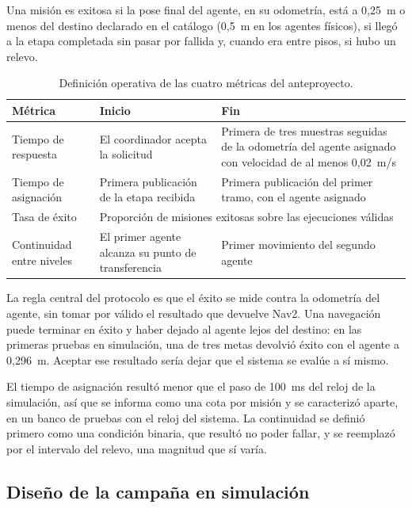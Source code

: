 Una misión es exitosa si la pose final del agente, en su odometría, está a 0,25~m o menos del destino declarado en el catálogo (0,5~m en los agentes físicos), si llegó a la etapa completada sin pasar por fallida y, cuando era entre
pisos, si hubo un relevo.

\begin{table}[H]
  \centering\footnotesize
  \caption{Definición operativa de las cuatro métricas del anteproyecto.}
  \label{tab:metricas}
  \begin{tabular}{@{}p{}p{}p{}@{}}
    \toprule
    \textbf{Métrica} & \textbf{Inicio} & \textbf{Fin} \\ \midrule
    Tiempo de respuesta & El coordinador acepta la solicitud & Primera de tres muestras seguidas de la odometría del agente asignado con velocidad de al menos 0,02~m/s \\ \addlinespace
    Tiempo de asignación & Primera publicación de la etapa recibida & Primera publicación del primer tramo, con el agente asignado \\ \addlinespace
    Tasa de éxito & \multicolumn{2}{p{0.72\textwidth}}{Proporción de misiones exitosas sobre las ejecuciones válidas} \\ \addlinespace
    Continuidad entre niveles & El primer agente alcanza su punto de transferencia & Primer movimiento del segundo agente \\ \bottomrule
  \end{tabular}
\end{table}

La regla central del protocolo es que el éxito se mide contra la odometría del agente, sin tomar por válido el resultado que devuelve Nav2. Una navegación puede terminar en éxito y haber dejado al agente lejos del destino: en las
primeras pruebas en simulación, una de tres metas devolvió éxito con el agente a 0,296~m. Aceptar ese resultado sería dejar que el sistema se evalúe a sí mismo.

El tiempo de asignación resultó menor que el paso de 100~ms del reloj de la simulación, así que se informa como una cota por misión y se caracterizó aparte, en un banco de pruebas con el reloj del sistema. La continuidad se definió
primero como una condición binaria, que resultó no poder fallar, y se reemplazó por el intervalo del relevo, una magnitud que sí varía.

\subsection{Diseño de la campaña en simulación}

